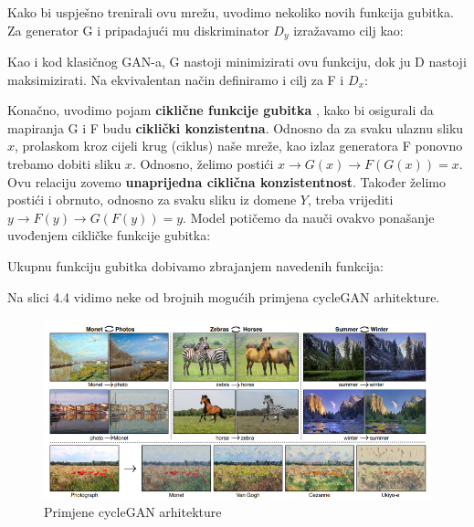 \noindent Kako bi uspješno trenirali ovu mrežu, uvodimo nekoliko novih funkcija gubitka. Za generator G i pripadajući mu diskriminator $D_{y}$ izražavamo cilj kao:

\begin{myequation}%
\end{myequation}

Kao i kod klasičnog GAN-a, G nastoji minimizirati ovu funkciju, dok ju D nastoji maksimizirati. Na ekvivalentan način definiramo i cilj za F i $D_{x}$:

\begin{myequation}%
\end{myequation}

Konačno, uvodimo pojam \textbf{ciklične funkcije gubitka} , kako bi osigurali da mapiranja G i F budu \textbf{ciklički konzistentna}. Odnosno da za svaku ulaznu sliku $x$, prolaskom kroz cijeli krug (ciklus) naše mreže, kao izlaz generatora F ponovno trebamo dobiti sliku $x$. Odnosno, želimo postići $x \longrightarrow G(x) \longrightarrow F(G(x)) = x$. Ovu relaciju zovemo \textbf{unaprijedna ciklična konzistentnost}. Također želimo postići i obrnuto, odnosno za svaku sliku iz domene $Y$, treba vrijediti $y \longrightarrow F(y) \longrightarrow G(F(y)) = y$. Model potičemo da nauči ovakvo ponašanje uvođenjem cikličke funkcije gubitka: 

\begin{myequation}%
\end{myequation}

Ukupnu funkciju gubitka dobivamo zbrajanjem navedenih funkcija:

\begin{myequation}%
\end{myequation}


\noindent Na slici 4.4 vidimo neke od brojnih mogućih primjena cycleGAN arhitekture.

\begin{figure}[htb]
\hspace{-2cm}
\includegraphics[width=18cm]{slike/cycleGAN2.png}
\caption{Primjene cycleGAN arhitekture \citep{cycleGANOriginal}}
\label{fig:fer-logo}
\end{figure}
\textbf{}
